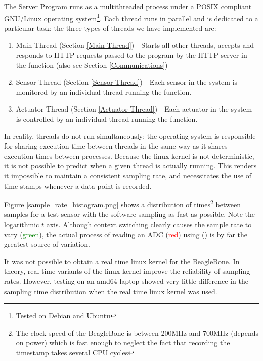 The Server Program runs as a multithreaded process under a POSIX compliant GNU/Linux operating system\footnote{Tested on Debian and Ubuntu}. Each thread runs in parallel and is dedicated to a particular task; the three types of threads we have implemented are:
\begin{enumerate}
  \item Main Thread (Section \ref{Main Thread}) - Starts all other threads, accepts and responds to HTTP requests passed to the program by the HTTP server in the  function (also see Section \ref{Communications})
  \item Sensor Thread (Section \ref{Sensor Thread}) - Each sensor in the system is monitored by an individual thread running the  function.
  \item Actuator Thread (Section \ref{Actuator Thread}) - Each actuator in the system is controlled by an individual thread running the  function.
\end{enumerate}


In reality, threads do not run simultaneously; the operating system is responsible for sharing execution time between threads in the same way as it shares execution times between processes. Because the linux kernel is not deterministic, it is not possible to predict when a given thread is actually running. This renders it impossible to maintain a consistent sampling rate, and necessitates the use of time stamps whenever a data point is recorded. 

Figure \ref{sample_rate_histogram.png} shows a distribution of times\footnote{The clock speed of the BeagleBone is between 200MHz and 700MHz (depends on power)\cite{cameon.net} which is fast enough to neglect the fact that recording the timestamp takes several CPU cycles} between samples for a test sensor with the software sampling as fast as possible. Note the logarithmic $t$ axis. Although context switching clearly causes the sample rate to vary (\textcolor{green}{green}), the actual process of reading an ADC (\textcolor{red}{red}) using  () is by far the greatest source of variation.

It was not possible to obtain a real time linux kernel for the BeagleBone. In theory, real time variants of the linux kernel improve the reliability of sampling rates. However, testing on an amd64 laptop showed very little difference in the sampling time distribution when the real time linux kernel was used.


